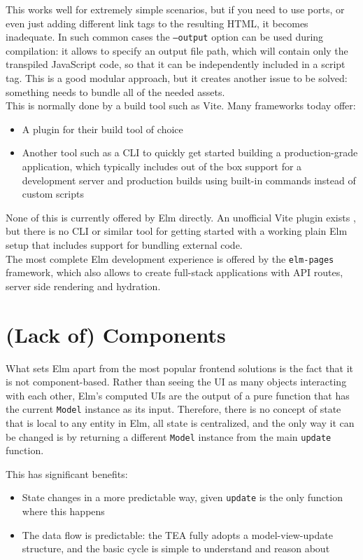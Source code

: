 This works well for extremely simple scenarios, but if you need to use ports, or even just adding different link tags to the resulting HTML, it becomes inadequate. In such common cases the \texttt{--output} option can be used during compilation: it allows to specify an output file path, which will contain only the transpiled JavaScript code, so that it can be independently included in a script tag. This is a good modular approach, but it creates another issue to be solved: something needs to bundle all of the needed assets.\\

This is normally done by a build tool such as Vite. Many frameworks today offer:
\begin{itemize}
    \item A plugin for their build tool of choice
    \item Another tool such as a CLI to quickly get started building a production-grade application, which typically includes out of the box support for a development server and production builds using built-in commands instead of custom scripts
\end{itemize}
None of this is currently offered by Elm directly. An unofficial Vite plugin exists \cite{hamasaki_hmskvite-plugin-elm_2024}, but there is no CLI or similar tool for getting started with a working plain Elm setup that includes support for bundling external code.\\

The most complete Elm development experience is offered by the \texttt{elm-pages} framework, which also allows to create full-stack applications with API routes, server side rendering and hydration. \cite{noauthor_what_nodate}

\section{(Lack of) Components}
What sets Elm apart from the most popular frontend solutions is the fact that it is not component-based. Rather than seeing the UI as many objects interacting with each other, Elm's computed UIs are the output of a pure function that has the current \texttt{Model} instance as its input. Therefore, there is no concept of state that is local to any entity in Elm, all state is centralized, and the only way it can be changed is by returning a different \texttt{Model} instance from the main \texttt{update} function.

This has significant benefits:
\begin{itemize}
    \item State changes in a more predictable way, given \texttt{update} is the only function where this happens
    \item The data flow is predictable: the TEA fully adopts a model-view-update structure, and the basic cycle is simple to understand and reason about
\end{itemize}

